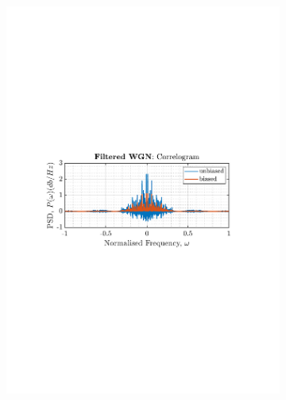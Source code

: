 \documentclass[12pt]{article}
\begin{document}
\begin{figure}[H]
\begin{subfigure}{0.49\textwidth}
			\includegraphics[trim={2.2cm 11cm 3.15cm  11.2cm}, clip, width=\textwidth]{../MATLAB/figures/q1_3a_fig05.pdf} 
		\end{subfigure}
				\begin{subfigure}{0.49\textwidth}
			\centering

\end{subfigure}
\end{figure}
\end{document}
